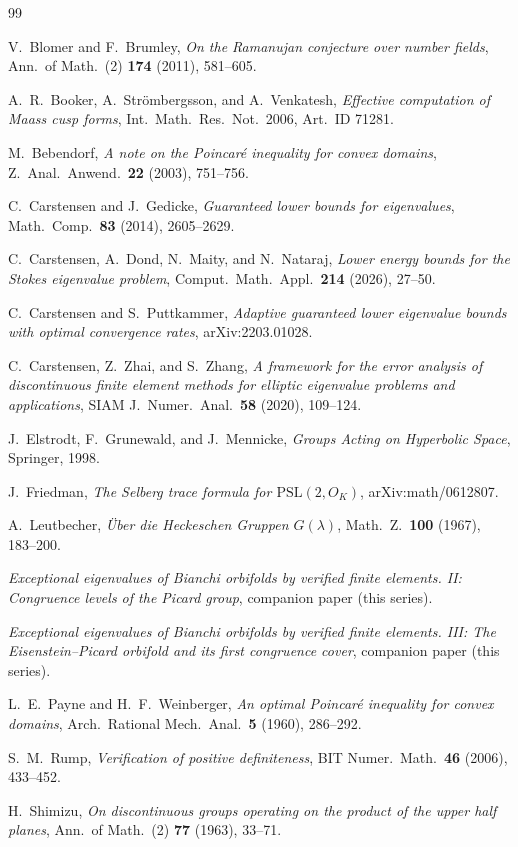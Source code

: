 \documentclass[11pt]{amsart}
\begin{document}
\begin{thebibliography}{99}

V.~Blomer and F.~Brumley,
\emph{On the Ramanujan conjecture over number fields},
Ann.\ of Math.\ (2) \textbf{174} (2011), 581--605.

A.~R.~Booker, A.~Str\"ombergsson, and A.~Venkatesh,
\emph{Effective computation of Maass cusp forms},
Int.\ Math.\ Res.\ Not.\ 2006, Art.\ ID 71281.

M.~Bebendorf,
\emph{A note on the Poincar\'e inequality for convex domains},
Z.\ Anal.\ Anwend.\ \textbf{22} (2003), 751--756.

C.~Carstensen and J.~Gedicke,
\emph{Guaranteed lower bounds for eigenvalues},
Math.\ Comp.\ \textbf{83} (2014), 2605--2629.

C.~Carstensen, A.~Dond, N.~Maity, and N.~Nataraj,
\emph{Lower energy bounds for the Stokes eigenvalue problem},
Comput.\ Math.\ Appl.\ \textbf{214} (2026), 27--50.

C.~Carstensen and S.~Puttkammer,
\emph{Adaptive guaranteed lower eigenvalue bounds with optimal
convergence rates},
arXiv:2203.01028.

C.~Carstensen, Z.~Zhai, and S.~Zhang,
\emph{A framework for the error analysis of discontinuous finite element
methods for elliptic eigenvalue problems and applications},
SIAM J.\ Numer.\ Anal.\ \textbf{58} (2020), 109--124.

J.~Elstrodt, F.~Grunewald, and J.~Mennicke,
\emph{Groups Acting on Hyperbolic Space},
Springer, 1998.

J.~Friedman,
\emph{The Selberg trace formula for $\mathrm{PSL}(2,O_K)$},
arXiv:math/0612807.

A.~Leutbecher,
\emph{\"Uber die Heckeschen Gruppen $G(\lambda)$},
Math.\ Z.\ \textbf{100} (1967), 183--200.

\emph{Exceptional eigenvalues of Bianchi orbifolds by verified finite
elements.  II: Congruence levels of the Picard group},
companion paper (this series).

\emph{Exceptional eigenvalues of Bianchi orbifolds by verified finite
elements.  III: The Eisenstein--Picard orbifold and its first
congruence cover},
companion paper (this series).

L.~E.~Payne and H.~F.~Weinberger,
\emph{An optimal Poincar\'e inequality for convex domains},
Arch.\ Rational Mech.\ Anal.\ \textbf{5} (1960), 286--292.

S.~M.~Rump,
\emph{Verification of positive definiteness},
BIT Numer.\ Math.\ \textbf{46} (2006), 433--452.

H.~Shimizu,
\emph{On discontinuous groups operating on the product of the upper
half planes},
Ann.\ of Math.\ (2) \textbf{77} (1963), 33--71.

\end{thebibliography}
\end{document}
